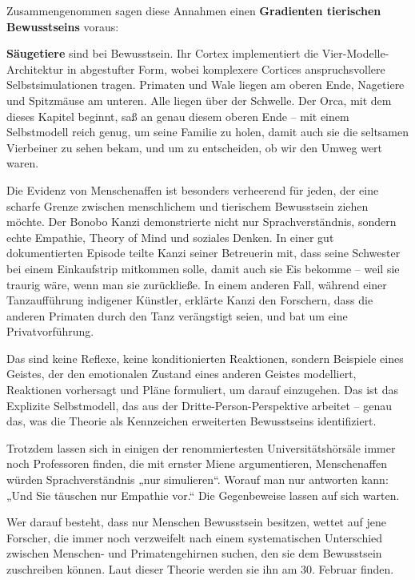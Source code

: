\documentclass[11pt, twoside, openright]{book}
\begin{document}
Zusammengenommen sagen diese Annahmen einen \textbf{Gradienten tierischen Bewusstseins} voraus:

\textbf{Säugetiere} sind bei Bewusstsein. Ihr Cortex implementiert die Vier-Modelle-Architektur in abgestufter Form, wobei komplexere Cortices anspruchsvollere Selbstsimulationen tragen. Primaten und Wale liegen am oberen Ende, Nagetiere und Spitzmäuse am unteren. Alle liegen über der Schwelle. Der Orca, mit dem dieses Kapitel beginnt, saß an genau diesem oberen Ende -- mit einem Selbstmodell reich genug, um seine Familie zu holen, damit auch sie die seltsamen Vierbeiner zu sehen bekam, und um zu entscheiden, ob wir den Umweg wert waren.

Die Evidenz von Menschenaffen ist besonders verheerend für jeden, der eine scharfe Grenze zwischen menschlichem und tierischem Bewusstsein ziehen möchte. Der Bonobo Kanzi demonstrierte nicht nur Sprachverständnis, sondern echte Empathie, Theory of Mind und soziales Denken. In einer gut dokumentierten Episode teilte Kanzi seiner Betreuerin mit, dass seine Schwester bei einem Einkaufstrip mitkommen solle, damit auch sie Eis bekomme -- weil sie traurig wäre, wenn man sie zurückließe. In einem anderen Fall, während einer Tanzaufführung indigener Künstler, erklärte Kanzi den Forschern, dass die anderen Primaten durch den Tanz verängstigt seien, und bat um eine Privatvorführung.

Das sind keine Reflexe, keine konditionierten Reaktionen, sondern Beispiele eines Geistes, der den emotionalen Zustand eines anderen Geistes modelliert, Reaktionen vorhersagt und Pläne formuliert, um darauf einzugehen. Das ist das Explizite Selbstmodell, das aus der Dritte-Person-Perspektive arbeitet -- genau das, was die Theorie als Kennzeichen erweiterten Bewusstseins identifiziert.

Trotzdem lassen sich in einigen der renommiertesten Universitätshörsäle immer noch Professoren finden, die mit ernster Miene argumentieren, Menschenaffen würden Sprachverständnis „nur simulieren“. Worauf man nur antworten kann: „Und Sie täuschen nur Empathie vor.“ Die Gegenbeweise lassen auf sich warten.

Wer darauf besteht, dass nur Menschen Bewusstsein besitzen, wettet auf jene Forscher, die immer noch verzweifelt nach einem systematischen Unterschied zwischen Menschen- und Primatengehirnen suchen, den sie dem Bewusstsein zuschreiben können. Laut dieser Theorie werden sie ihn am 30. Februar finden.
\end{document}
